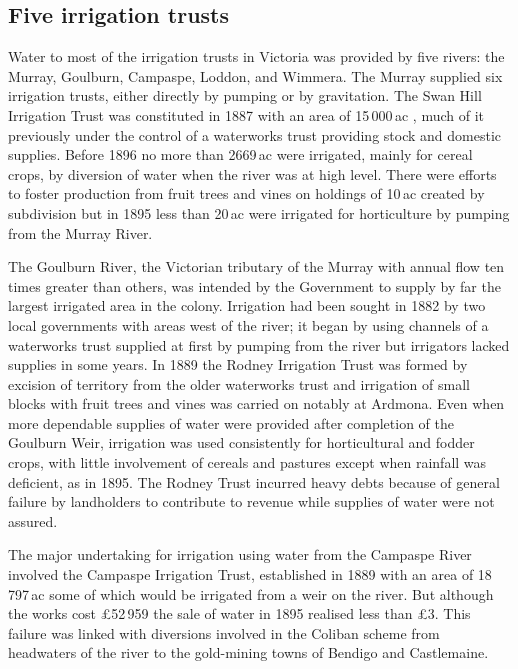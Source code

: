 \subsection*{Five irrigation trusts}

Water to most of the irrigation trusts in Victoria was provided by
five rivers: the Murray, Goulburn, Campaspe, Loddon, and Wimmera.  The
Murray supplied six irrigation trusts, either directly by pumping or
by gravitation.  The Swan Hill Irrigation Trust was constituted in
1887 with an area of 15\,000\,ac , much of it previously under the
control of a waterworks trust providing stock and domestic supplies.
Before 1896 no more than 2669\,ac were irrigated, mainly for cereal
crops, by diversion of water when the river was at high level. There
were efforts to foster production from fruit trees and vines on
holdings of 10\,ac created by subdivision but in 1895 less than 20\,ac
were irrigated for horticulture by pumping from the Murray
River.

The Goulburn River, the Victorian tributary of the Murray with annual
flow ten times greater than others, was intended by the Government to
supply by far the largest irrigated area in the colony.  Irrigation
had been sought in 1882 by two local governments with areas west of
the river; it began by using channels of a waterworks trust supplied
at first by pumping from the river but irrigators lacked supplies in
some years.  In 1889 the Rodney Irrigation Trust was formed by
excision of territory from the older waterworks trust and irrigation
of small blocks with fruit trees and vines was carried on notably at
Ardmona.  Even when more dependable supplies of water were provided
after completion of the Goulburn Weir, irrigation was used
consistently for horticultural and fodder crops, with little
involvement of cereals and pastures except when rainfall was
deficient, as in 1895.  The Rodney Trust incurred heavy debts because
of general failure by landholders to contribute to revenue while
supplies of water were not assured.

The major undertaking for irrigation using water from the Campaspe
River involved the Campaspe Irrigation Trust, established in 1889 with
an area of 18\,797\,ac some of which would be irrigated from a weir on
the river.  But although the works cost \pounds52\,959 the sale of
water in 1895 realised less than \pounds3. This failure was linked
with diversions involved in the Coliban scheme from headwaters of the
river to the gold-mining towns of Bendigo and Castlemaine.

